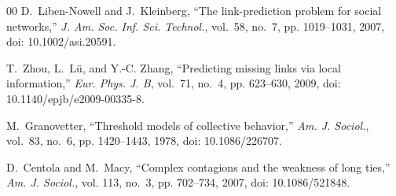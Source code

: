 \documentclass[conference]{IEEEtran}
\begin{document}
\begin{thebibliography}{00}
D.~Liben-Nowell and J.~Kleinberg, ``The link-prediction problem for social networks,'' \emph{J. Am. Soc. Inf. Sci. Technol.}, vol.~58, no.~7, pp. 1019--1031, 2007, doi: 10.1002/asi.20591.

T.~Zhou, L.~L{\"u}, and Y.-C. Zhang, ``Predicting missing links via local information,'' \emph{Eur. Phys. J. B}, vol.~71, no.~4, pp. 623--630, 2009, doi: 10.1140/epjb/e2009-00335-8.

M.~Granovetter, ``Threshold models of collective behavior,'' \emph{Am. J. Sociol.}, vol.~83, no.~6, pp. 1420--1443, 1978, doi: 10.1086/226707.

D.~Centola and M.~Macy, ``Complex contagions and the weakness of long ties,'' \emph{Am. J. Sociol.}, vol. 113, no.~3, pp. 702--734, 2007, doi: 10.1086/521848.

\end{thebibliography}
\end{document}
